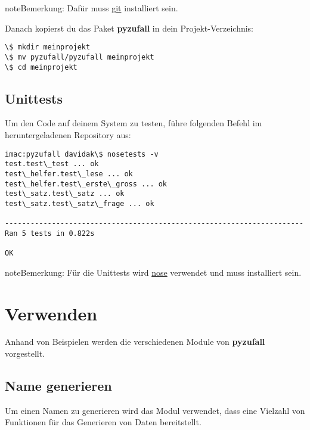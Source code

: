 \documentclass[a4paper,12pt,oneside]{sphinxmanual}
\begin{document}
\begin{notice}{note}{Bemerkung:}
Dafür muss \href{http://git-scm.com/}{git} installiert sein.
\end{notice}

Danach kopierst du das Paket \textbf{pyzufall} in dein Projekt-Verzeichnis:

\begin{Verbatim}[commandchars=\\\{\}]
\$ mkdir meinprojekt
\$ mv pyzufall/pyzufall meinprojekt
\$ cd meinprojekt
\end{Verbatim}


\section{Unittests}
\label{installation:unittests}
Um den Code auf deinem System zu testen, führe folgenden Befehl im heruntergeladenen Repository aus:

\begin{Verbatim}[commandchars=\\\{\}]
imac:pyzufall davidak\$ nosetests -v
test.test\_test ... ok
test\_helfer.test\_lese ... ok
test\_helfer.test\_erste\_gross ... ok
test\_satz.test\_satz ... ok
test\_satz.test\_satz\_frage ... ok

----------------------------------------------------------------------
Ran 5 tests in 0.822s

OK
\end{Verbatim}

\begin{notice}{note}{Bemerkung:}
Für die Unittests wird \href{https://nose.readthedocs.org/en/latest/}{nose} verwendet und muss installiert sein.
\end{notice}


\chapter{Verwenden}
\label{verwenden::doc}\label{verwenden:verwenden}
Anhand von Beispielen werden die verschiedenen Module von \textbf{pyzufall} vorgestellt.


\section{Name generieren}
\label{verwenden:name-generieren}
Um einen Namen zu generieren wird das Modul {\hyperref[module:module-pyzufall.generator]{}} verwendet, dass eine Vielzahl von Funktionen für das Generieren von Daten bereitstellt.
\end{document}
